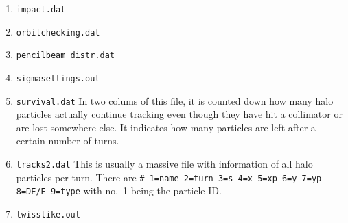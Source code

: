 \documentclass[a4paper, oneside, final]{scrartcl}
\begin{document}
{\begin{enumerate}
\item \texttt{impact.dat}
\item \texttt{orbitchecking.dat}
\item \texttt{pencilbeam\_distr.dat}
\item \texttt{sigmasettings.out}
\item \texttt{survival.dat} In two colums of this file, it is counted down how many halo particles actually continue tracking even though they have hit a collimator or are lost somewhere else. It indicates how many particles are left after a certain number of turns.

\item \texttt{tracks2.dat} This is usually a massive file with information of all halo particles per turn. There are \texttt{\# 1=name 2=turn 3=s 4=x 5=xp 6=y 7=yp 8=DE/E 9=type} with no.~1 being the particle ID.
\item \texttt{twisslike.out}
\end{enumerate}


}
\end{document}
